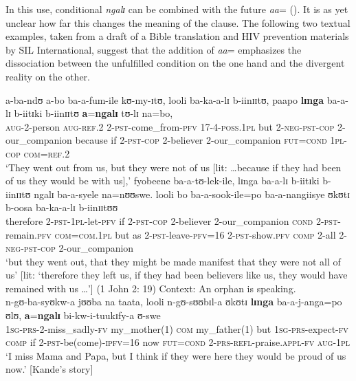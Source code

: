 In this use, conditional \textit{ngalɪ} can be combined with the future  \textit{aa}= (). It is as yet unclear how far this changes the meaning of the clause. The following two textual examples, taken from a draft of a Bible translation and HIV prevention materials by SIL International, suggest that the addition of \mbox{\textit{aa}=} emphasizes the dissociation between the unfulfilled condition on the one hand and the divergent reality on the other.
\begin{exe}
\ex \gll
a-ba-ndʊ a-bo ba-a-fum-ile kʊ-my-ɪtʊ, looli ba-ka-a-lɪ b-iinɪɪtʊ, paapo \textbf{lɪnga} ba-a-lɪ b-iitɪki b-iinɪɪtʊ \textbf{a}=\textbf{ngalɪ} tʊ-lɪ na=bo,\\
\textsc{aug}-2-person \textsc{aug}-\textsc{ref.2} 2-\textsc{pst}-come\_from-\textsc{pfv} 17-4-\textsc{poss.1pl} but 2-\textsc{neg}-\textsc{pst}-\textsc{cop} 2-our\_companion because if 2-\textsc{pst}-\textsc{cop} 2-believer 2-our\_companion \textsc{fut}=\textsc{cond} \textsc{1pl}-\textsc{cop} \textsc{com}=\textsc{ref.2}\\
\glt \lq They went out from us, but they were not of us [lit: \ldots because if they had been of us they would be with us],'
\sn \gll fyobeene ba-a-tʊ-lek-ile, lɪnga ba-a-lɪ b-iitɪki b-iinɪɪtʊ ngalɪ ba-a-syele na=nʊʊswe. looli bo ba-a-sook-ile=po ba-a-nangiisye ʊkʊtɪ b-oosa ba-ka-a-lɪ b-iinɪɪtʊʊ\\
therefore 2-\textsc{pst}-\textsc{1pl}-let-\textsc{pfv} if 2-\textsc{pst}-\textsc{cop} 2-believer 2-our\_companion \textsc{cond} 2-\textsc{pst}-remain.\textsc{pfv} \textsc{com}=\textsc{com.1pl} but as 2-\textsc{pst}-leave-\textsc{pfv}=16 2-\textsc{pst}-show.\textsc{pfv} \textsc{comp} 2-all 2-\textsc{neg}-\textsc{pst}-\textsc{cop} 2-our\_companion\\
\glt \lq  but they went out, that they might be made manifest that they were not all of us'  [lit: \lq therefore they left us, if they had been believers like us, they would have remained with us \ldots'] (1 John 2: 19)
\ex Context: An orphan is speaking.\\
\gll n-gʊ-ba-syʊkw-a jʊʊba na taata, looli n-gʊ-sʊʊbɪl-a ʊkʊtɪ \textbf{lɪnga} ba-a-j-anga=po ʊlʊ, \textbf{a}=\textbf{ngalɪ} bi-kw-i-tuukɪfy-a ʊ-swe\\
\textsc{1sg}-\textsc{prs}-2-miss\_sadly-\textsc{fv} my\_mother(1) \textsc{com} my\_father(1) but \textsc{1sg}-\textsc{prs}-expect-\textsc{fv} \textsc{comp} if 2-\textsc{pst}-be(come)-\textsc{ipfv}=16 now \textsc{fut}=\textsc{cond} 2-\textsc{prs}-\textsc{refl}-praise.\textsc{appl}-\textsc{fv} \textsc{aug}-\textsc{1pl}\\
\glt \lq I miss Mama and Papa, but I think if they were here they would be proud of us now.' [Kande's story]\footnotemark
\protect{}
\end{exe}

